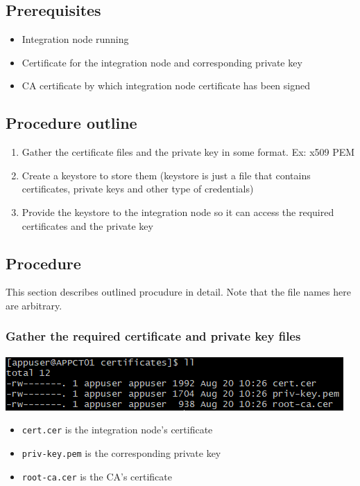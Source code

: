 \documentclass{article}
\begin{document}
    \subsection{Prerequisites}
    \begin{itemize}
        \item Integration node running
        \item Certificate for the integration node and corresponding private key
        \item CA certificate by which integration node certificate has been signed
    \end{itemize}

    \subsection{Procedure outline}
    \begin{enumerate}
        \item Gather the certificate files and the private key in some format. Ex: x509 PEM
        \item Create a keystore to store them (keystore is just a file that contains certificates, private keys and other type of credentials)
        \item Provide the keystore to the integration node so it can access the required certificates and the private key
    \end{enumerate}

    \subsection{Procedure}
    This section describes outlined procudure in detail. Note that the file names here are arbitrary.
    \subsubsection{Gather the required certificate and private key files}
    \includegraphics[width=\textwidth,height=\textheight,keepaspectratio]{cert-ls.png}
    \begin{itemize}
        \item \texttt{cert.cer} is the integration node's certificate
        \item \texttt{priv-key.pem}  is the corresponding private key
        \item \texttt{root-ca.cer} is the CA's certificate
    \end{itemize}
\end{document}
